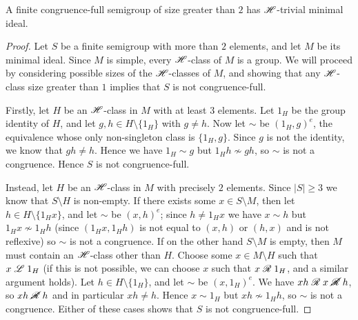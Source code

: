 \begin{lemma}
  \label{lem:m-is-h-trivial}
  A finite congruence-full semigroup of size greater than $2$ has $\mathrel{\mathscr{H}}$-trivial
  minimal ideal.
  \begin{proof}
    Let $S$ be a finite semigroup with more than $2$ elements,
    and let $M$ be its minimal ideal.  Since $M$ is simple, every $\mathrel{\mathscr{H}}$-class of
    $M$ is a group.  We will proceed by considering possible sizes of the
    $\mathrel{\mathscr{H}}$-classes of $M$, and showing that any $\mathrel{\mathscr{H}}$-class size greater than $1$
    implies that $S$ is not congruence-full.

    Firstly, let $H$ be an $\mathrel{\mathscr{H}}$-class in $M$ with at least $3$ elements.  Let
    $1_H$ be the group identity of $H$, and let $g,h \in H\setminus\{1_H\}$ with
    $g \neq h$.  Now let $\sim$ be $(1_H, g)^e$, the equivalence whose only
    non-singleton class is $\{1_H,g\}$.  Since $g$ is not the identity, we know
    that $gh \neq h$.  Hence we have $1_H \sim g$ but $1_H h \nsim gh$, so
    $\sim$ is not a congruence.  Hence $S$ is not congruence-full.

    Instead, let $H$ be an $\mathrel{\mathscr{H}}$-class in $M$ with precisely $2$ elements.
    Since $|S| \geq 3$ we know that $S \setminus H$ is non-empty.  If there
    exists some $x \in S \setminus M$, then let $h \in H \setminus \{1_H x\}$,
    and let $\sim$ be $(x,h)^e$; since $h \neq 1_H x$ we have $x \sim h$ but
    $1_H x \nsim 1_H h$ (since $(1_Hx, 1_Hh)$ is not equal to $(x,h)$ or $(h,x)$
    and is not reflexive) so $\sim$ is not a congruence.  If on the other hand
    $S \setminus M$ is empty, then $M$ must contain an $\mathrel{\mathscr{H}}$-class other than
    $H$.  Choose some $x \in M \setminus H$ such that $x \mathrel{\mathscr{L}} 1_H$ (if this is
    not possible, we can choose $x$ such that $x \mathrel{\mathscr{R}} 1_H$, and a similar
    argument holds).  Let $h \in H \setminus \{1_H\}$, and let $\sim$ be
    $(x,1_H)^e$.  We have $xh \mathrel{\mathscr{R}} x \mathrel{\cancel{\mathscr{R}}} h$, so $xh \mathrel{\cancel{\mathscr{R}}} h$ and in particular
    $xh \neq h$.  Hence $x \sim 1_H$ but $xh \nsim 1_H h$, so $\sim$ is not a
    congruence.  Either of these cases shows that $S$ is not congruence-full.
  \end{proof}
\end{lemma}

